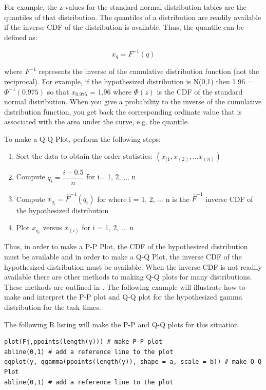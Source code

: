 \documentclass[
]{book}
\theoremstyle{definition}
\theoremstyle{definition}
\theoremstyle{definition}
\theoremstyle{definition}
\theoremstyle{remark}
\begin{document}
For example, the z-values for the standard normal distribution tables
are the quantiles of that distribution. The quantiles of a distribution
are readily available if the inverse CDF of the distribution is
available. Thus, the quantile can be defined as:

\[x_q = F^{-1}(q)\]

where \(F^{-1}\) represents the inverse of the cumulative distribution
function (not the reciprocal). For example, if the hypothesized
distribution is N(0,1) then 1.96 = \(\Phi^{-1}(0.975)\) so that
\(x_{0.975}\) = 1.96 where \(\Phi(z)\) is the CDF of the standard normal
distribution. When you give a probability to the inverse of the
cumulative distribution function, you get back the corresponding
ordinate value that is associated with the area under the curve, e.g.
the quantile.

To make a Q-Q Plot, perform the following steps:

\begin{enumerate}
\def\labelenumi{\arabic{enumi}.}
\item
  Sort the data to obtain the order statistics:
  \((x_{(1}, x_{(2)}, \ldots x_{(n)})\)
\item
  Compute \(q_i = \dfrac{i - 0.5}{n}\) for i= 1, 2, \(\ldots\) n
\item
  Compute \(x_{q_i} = \hat{F}^{-1} (q_i)\) for where i = 1, 2, \(\ldots\)
  n is the \(\hat{F}^{-1}\) inverse CDF of the hypothesized distribution
\item
  Plot \(x_{q_i}\) versus \(x_{(i)}\) for i = 1, 2, \(\ldots\) n
\end{enumerate}

Thus, in order to make a P-P Plot, the CDF of the hypothesized
distribution must be available and in order to make a Q-Q Plot, the
inverse CDF of the hypothesized distribution must be available. When the
inverse CDF is not readily available there are other methods to making
Q-Q plots for many distributions. These methods are outlined in
\citep{law2007simulation}. The following example will illustrate how to make
and interpret the P-P plot and Q-Q plot for the hypothesized gamma
distribution for the task times.

The following R listing will make the P-P and Q-Q plots for this
situation.

\begin{verbatim}
plot(Fj,ppoints(length(y))) # make P-P plot
abline(0,1) # add a reference line to the plot
qqplot(y, qgamma(ppoints(length(y)), shape = a, scale = b)) # make Q-Q Plot
abline(0,1) # add a reference line to the plot
\end{verbatim}
\end{document}

